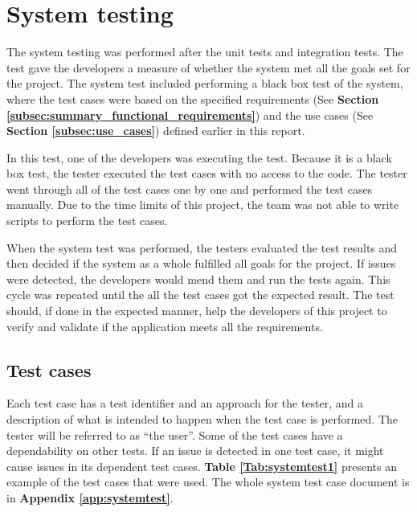 \section{System testing}
The system testing was performed after the unit tests and integration tests. The test gave the developers a measure of whether the system met all the goals set for the project. The system test included performing a black box test of the system, where the test cases were based on the specified requirements (See \textbf{Section \ref{subsec:summary_functional_requirements}}) and the use cases (See \textbf{Section \ref{subsec:use_cases}}) defined earlier in this report. \newline

In this test, one of the developers was executing the test. Because it is a black box test, the tester executed the test cases with no access to the code. The tester went through all of the test cases one by one and performed the test cases manually. Due to the time limits of this project, the team was not able to write scripts to perform the test cases. \newline

When the system test was performed, the testers evaluated the test results and then decided if the system as a whole fulfilled all goals for the project. If issues were detected, the developers would mend them and run the tests again. This cycle was repeated until the all the test cases got the expected result. The test should, if done in the expected manner, help the developers of this project to verify and validate if the application meets all the requirements.

\subsection{Test cases}

Each test case has a test identifier and an approach for the tester, and a description of what is intended to happen when the test case is performed. The tester will be referred to as “the user”. 
Some of the test cases have a dependability on other tests. If an issue is detected in one test case, it might cause issues in its dependent test cases. \textbf{Table \ref{Tab:systemtest1}} presents an example of the test cases that were used. The whole system test case document is in \textbf{Appendix \ref{app:systemtest}}. 

